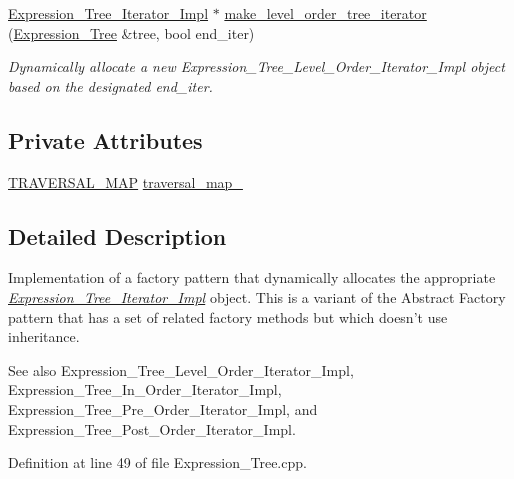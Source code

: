\begin{DoxyCompactItemize}
\hyperlink{classMadara_1_1Expression__Tree_1_1Expression__Tree__Iterator__Impl}{Expression\_\-Tree\_\-Iterator\_\-Impl} $\ast$ \hyperlink{classMadara_1_1Expression__Tree_1_1Expression__Tree__Iterator__Factory_a60efc8c810a76c3374505feed34326e0}{make\_\-level\_\-order\_\-tree\_\-iterator} (\hyperlink{classMadara_1_1Expression__Tree_1_1Expression__Tree}{Expression\_\-Tree} \&tree, bool end\_\-iter)
\begin{DoxyCompactList}\small\item\em Dynamically allocate a new {\itshape Expression\_\-Tree\_\-Level\_\-Order\_\-Iterator\_\-Impl\/} object based on the designated {\itshape end\_\-iter\/}. \item\end{DoxyCompactList}\end{DoxyCompactItemize}
\subsection*{Private Attributes}
\begin{DoxyCompactItemize}
\item 
\hyperlink{classMadara_1_1Expression__Tree_1_1Expression__Tree__Iterator__Factory_aa032e0fc34454740fe22d550406e6f2b}{TRAVERSAL\_\-MAP} \hyperlink{classMadara_1_1Expression__Tree_1_1Expression__Tree__Iterator__Factory_aaf39c92f409756d9e9e46d0e8f0c9a65}{traversal\_\-map\_\-}
\end{DoxyCompactItemize}


\subsection{Detailed Description}
Implementation of a factory pattern that dynamically allocates the appropriate {\itshape \hyperlink{classMadara_1_1Expression__Tree_1_1Expression__Tree__Iterator__Impl}{Expression\_\-Tree\_\-Iterator\_\-Impl}\/} object. This is a variant of the Abstract Factory pattern that has a set of related factory methods but which doesn't use inheritance.

\begin{DoxySeeAlso}{See also}
Expression\_\-Tree\_\-Level\_\-Order\_\-Iterator\_\-Impl, Expression\_\-Tree\_\-In\_\-Order\_\-Iterator\_\-Impl, Expression\_\-Tree\_\-Pre\_\-Order\_\-Iterator\_\-Impl, and Expression\_\-Tree\_\-Post\_\-Order\_\-Iterator\_\-Impl. 
\end{DoxySeeAlso}


Definition at line 49 of file Expression\_\-Tree.cpp.




